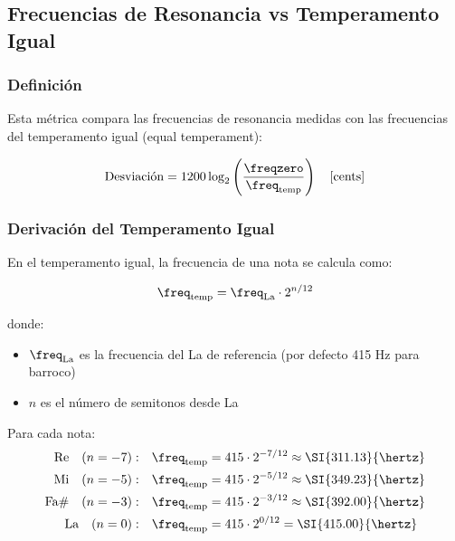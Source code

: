 
\subsection{Frecuencias de Resonancia vs Temperamento Igual}

\subsubsection{Definición}

Esta métrica compara las frecuencias de resonancia medidas con las frecuencias del temperamento igual (equal temperament):

\begin{equation}
\text{Desviación} = 1200 \log_2\left(\frac{\freqzero}{\freq_{\text{temp}}}\right) \quad \text{[cents]}
\label{eq:deviation_temperament}
\end{equation}

\subsubsection{Derivación del Temperamento Igual}

En el temperamento igual, la frecuencia de una nota se calcula como:

\begin{equation}
\freq_{\text{temp}} = \freq_{\text{La}} \cdot 2^{n/12}
\end{equation}

donde:
\begin{itemize}
    \item $\freq_{\text{La}}$ es la frecuencia del La de referencia (por defecto 415 Hz para barroco)
    \item $n$ es el número de semitonos desde La
\end{itemize}

Para cada nota:
\begin{align}
\text{Re} \quad (n = -7): \quad &\freq_{\text{temp}} = 415 \cdot 2^{-7/12} \approx \SI{311.13}{\hertz} \\
\text{Mi} \quad (n = -5): \quad &\freq_{\text{temp}} = 415 \cdot 2^{-5/12} \approx \SI{349.23}{\hertz} \\
\text{Fa\#} \quad (n = -3): \quad &\freq_{\text{temp}} = 415 \cdot 2^{-3/12} \approx \SI{392.00}{\hertz} \\
\text{La} \quad (n = 0): \quad &\freq_{\text{temp}} = 415 \cdot 2^{0/12} = \SI{415.00}{\hertz}
\end{align}

